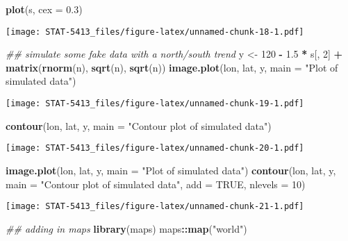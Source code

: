 \documentclass[]{book}
\newenvironment{Shaded}{\begin{snugshade}}{\end{snugshade}}
\newcommand{\CommentTok}[1]{\textcolor[rgb]{0.56,0.35,0.01}{\textit{#1}}}
\newcommand{\DataTypeTok}[1]{\textcolor[rgb]{0.13,0.29,0.53}{#1}}
\newcommand{\DecValTok}[1]{\textcolor[rgb]{0.00,0.00,0.81}{#1}}
\newcommand{\FloatTok}[1]{\textcolor[rgb]{0.00,0.00,0.81}{#1}}
\newcommand{\KeywordTok}[1]{\textcolor[rgb]{0.13,0.29,0.53}{\textbf{#1}}}
\newcommand{\NormalTok}[1]{#1}
\newcommand{\OperatorTok}[1]{\textcolor[rgb]{0.81,0.36,0.00}{\textbf{#1}}}
\newcommand{\OtherTok}[1]{\textcolor[rgb]{0.56,0.35,0.01}{#1}}
\newcommand{\StringTok}[1]{\textcolor[rgb]{0.31,0.60,0.02}{#1}}
\begin{document}
\begin{Shaded}
\begin{Highlighting}[]
\KeywordTok{plot}\NormalTok{(s, }\DataTypeTok{cex =} \FloatTok{0.3}\NormalTok{)}
\end{Highlighting}
\end{Shaded}

\texttt{[image: STAT-5413\_files/figure-latex/unnamed-chunk-18-1.pdf]}

\begin{Shaded}
\begin{Highlighting}[]
\CommentTok{## simulate some fake data with a north/south trend}
\NormalTok{y <-}\StringTok{ }\DecValTok{120} \OperatorTok{-}\StringTok{ }\FloatTok{1.5} \OperatorTok{*}\StringTok{ }\NormalTok{s[, }\DecValTok{2}\NormalTok{] }\OperatorTok{+}\StringTok{ }\KeywordTok{matrix}\NormalTok{(}\KeywordTok{rnorm}\NormalTok{(n), }\KeywordTok{sqrt}\NormalTok{(n), }\KeywordTok{sqrt}\NormalTok{(n))}
\KeywordTok{image.plot}\NormalTok{(lon, lat, y, }\DataTypeTok{main =} \StringTok{"Plot of simulated data"}\NormalTok{)}
\end{Highlighting}
\end{Shaded}

\texttt{[image: STAT-5413\_files/figure-latex/unnamed-chunk-19-1.pdf]}

\begin{Shaded}
\begin{Highlighting}[]
\KeywordTok{contour}\NormalTok{(lon, lat, y, }\DataTypeTok{main =} \StringTok{"Contour plot of simulated data"}\NormalTok{)}
\end{Highlighting}
\end{Shaded}

\texttt{[image: STAT-5413\_files/figure-latex/unnamed-chunk-20-1.pdf]}

\begin{Shaded}
\begin{Highlighting}[]
\KeywordTok{image.plot}\NormalTok{(lon, lat, y, }\DataTypeTok{main =} \StringTok{"Plot of simulated data"}\NormalTok{)}
\KeywordTok{contour}\NormalTok{(lon, lat, y, }\DataTypeTok{main =} \StringTok{"Contour plot of simulated data"}\NormalTok{, }\DataTypeTok{add =} \OtherTok{TRUE}\NormalTok{,}
        \DataTypeTok{nlevels =} \DecValTok{10}\NormalTok{)}
\end{Highlighting}
\end{Shaded}

\texttt{[image: STAT-5413\_files/figure-latex/unnamed-chunk-21-1.pdf]}

\begin{Shaded}
\begin{Highlighting}[]
\CommentTok{## adding in maps}
\KeywordTok{library}\NormalTok{(maps)}
\NormalTok{maps}\OperatorTok{::}\KeywordTok{map}\NormalTok{(}\StringTok{"world"}\NormalTok{)}
\end{Highlighting}
\end{Shaded}
\end{document}
